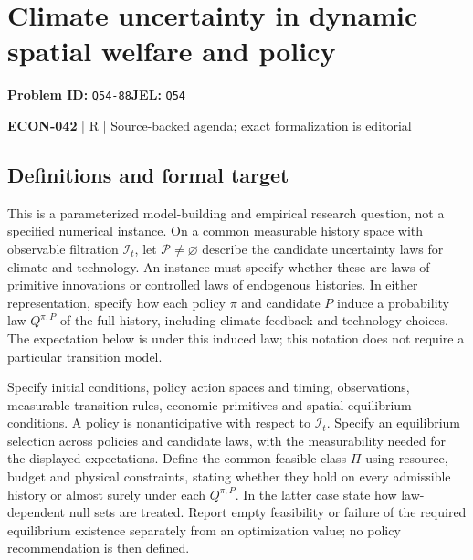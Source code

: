 \documentclass[11pt,a4paper]{article}
\begin{document}
\section*{Climate uncertainty in dynamic spatial welfare and policy}
\textbf{Problem ID:} \texttt{Q54-88}\quad \textbf{JEL:} \texttt{Q54}\par
\label{problem:OP-0615}


\label{audited:ECON-042}

{\sffamily\small\color{muted}\textbf{ECON-042} | R | Source-backed agenda; exact formalization is editorial\par}

\subsection*{Definitions and formal target}

This is a parameterized model-building and empirical research question, not a specified numerical instance. On a common measurable history space with observable filtration \(\mathcal I_t\), let \(\mathcal P\ne\varnothing\) describe the candidate uncertainty laws for climate and technology. An instance must specify whether these are laws of primitive innovations or controlled laws of endogenous histories. In either representation, specify how each policy \(\pi\) and candidate \(P\) induce a probability law \(Q^{\pi,P}\) of the full history, including climate feedback and technology choices. The expectation below is under this induced law; this notation does not require a particular transition model.

Specify initial conditions, policy action spaces and timing, observations, measurable transition rules, economic primitives and spatial equilibrium conditions. A policy is nonanticipative with respect to \(\mathcal I_t\). Specify an equilibrium selection across policies and candidate laws, with the measurability needed for the displayed expectations. Define the common feasible class \(\Pi\) using resource, budget and physical constraints, stating whether they hold on every admissible history or almost surely under each \(Q^{\pi,P}\). In the latter case state how law-dependent null sets are treated. Report empty feasibility or failure of the required equilibrium existence separately from an optimization value; no policy recommendation is then defined.
\end{document}
